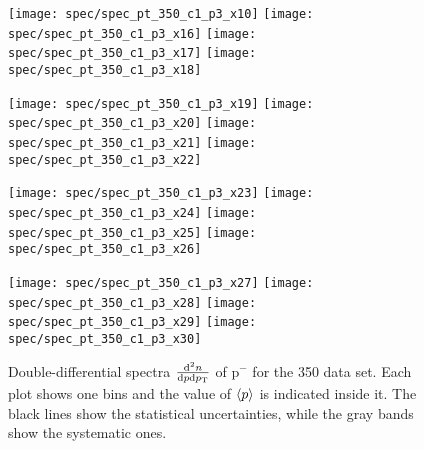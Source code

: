 \begin{figure}[!ht]
  \centering

  \texttt{[image: spec/spec\_pt\_350\_c1\_p3\_x10]}
  \texttt{[image: spec/spec\_pt\_350\_c1\_p3\_x16]}
  \texttt{[image: spec/spec\_pt\_350\_c1\_p3\_x17]}
  \texttt{[image: spec/spec\_pt\_350\_c1\_p3\_x18]}

  \texttt{[image: spec/spec\_pt\_350\_c1\_p3\_x19]}
  \texttt{[image: spec/spec\_pt\_350\_c1\_p3\_x20]}
  \texttt{[image: spec/spec\_pt\_350\_c1\_p3\_x21]}
  \texttt{[image: spec/spec\_pt\_350\_c1\_p3\_x22]}

  \texttt{[image: spec/spec\_pt\_350\_c1\_p3\_x23]}
  \texttt{[image: spec/spec\_pt\_350\_c1\_p3\_x24]}
  \texttt{[image: spec/spec\_pt\_350\_c1\_p3\_x25]}
  \texttt{[image: spec/spec\_pt\_350\_c1\_p3\_x26]}

  \texttt{[image: spec/spec\_pt\_350\_c1\_p3\_x27]}
  \texttt{[image: spec/spec\_pt\_350\_c1\_p3\_x28]}
  \texttt{[image: spec/spec\_pt\_350\_c1\_p3\_x29]}
  \texttt{[image: spec/spec\_pt\_350\_c1\_p3\_x30]}
 
  \caption{Double-differential spectra $\frac{\text{d}^2n}{\text{d}p\text{d}p_\text{T}}$
    of p$^-$ for the 350 \GeVc data set. Each plot shows one \pp bins and the value
    of $\langle p\rangle$ is indicated inside it. The black lines show the statistical
    uncertainties, while the gray bands show the systematic ones.}
  \label{fig:hadron:spec:dedx:all350:c1p3}
\end{figure}

\clearpage

